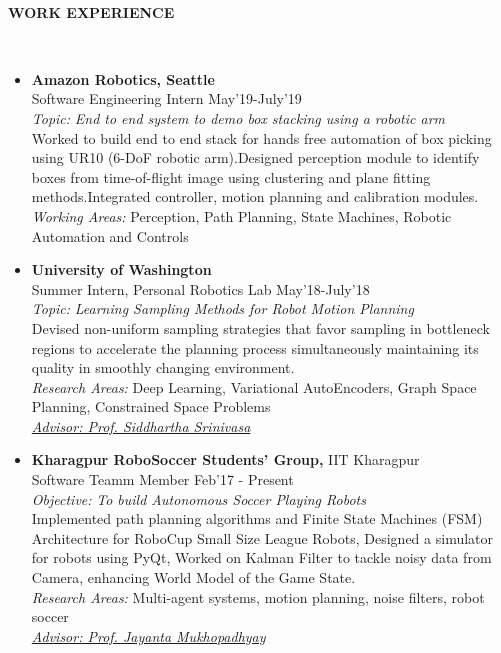 \documentclass[a4paper,8pt]{article}
\newcommand{\lsep}{-0.5cm}
\newcommand{\resheading}[1]{{\small \colorbox{mygrey}{\begin{minipage}{0.975\textwidth}{\textbf{#1 \vphantom{p\^{E}}}}\end{minipage}}}}
\begin{document}
\hspace{0.5cm}\\[-0.2cm]
\resheading{\textbf{WORK EXPERIENCE} }\\[\lsep]

\begin{itemize}
\item \textbf{Amazon Robotics, Seattle} \\
\small{Software Engineering Intern} \hfill \small{May'19-July'19}  \\
\textit{Topic: } \textit{End to end system to demo box stacking using a robotic arm} \\
\small{Worked to build end to end stack for hands free automation of box picking using UR10 (6-DoF robotic arm).Designed perception module to identify boxes from time-of-flight image using clustering and plane fitting methods.Integrated controller, motion planning and calibration modules.} \\
\textit{Working Areas: } \small{Perception, Path Planning, State Machines, Robotic Automation and Controls} 

\item \textbf{University of Washington} \\
\small{Summer Intern, Personal Robotics Lab} \hfill \small{May'18-July'18}  \\
\textit{Topic: } \textit{Learning Sampling Methods for Robot Motion Planning} \\
\small{Devised non-uniform sampling strategies that favor sampling in bottleneck regions to accelerate
the planning process simultaneously maintaining its quality in smoothly changing environment.} \\
\textit{Research Areas: } \small{Deep Learning, Variational AutoEncoders, Graph Space Planning, Constrained Space Problems} \\
\href {https://goodrobot.ai/} {\textit{Advisor: Prof. Siddhartha Srinivasa}}

\item \textbf{Kharagpur RoboSoccer Students' Group,} \small{ IIT Kharagpur} \\
\small{Software Teamm Member} \hfill \small{Feb'17 - Present}\\
\textit{Objective: } \textit{To build Autonomous Soccer Playing Robots} \\
\small{Implemented path planning algorithms and Finite State Machines (FSM) Architecture for RoboCup Small Size League Robots, Designed a simulator for
robots using PyQt, Worked on Kalman Filter to tackle noisy data from Camera, enhancing World Model of the Game State.} \\
\textit{Research Areas: } \small{Multi-agent systems, motion planning, noise filters, robot soccer} \\
\href{http://www.facweb.iitkgp.ac.in/~jay/}{\textit{Advisor: Prof. Jayanta Mukhopadhyay}}
\end{itemize}
\end{document}
